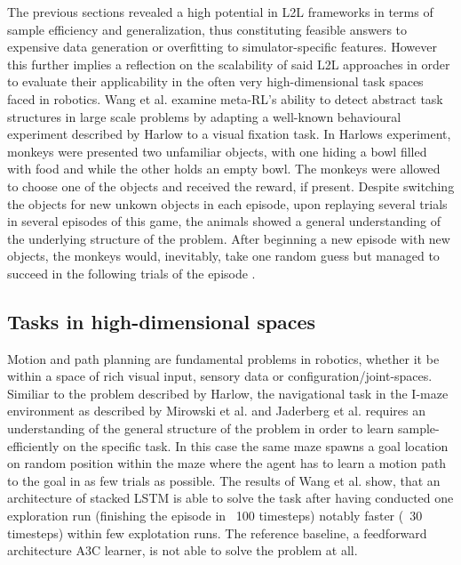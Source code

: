 \documentclass[letterpaper, 10 pt, conference]{ieeeconf}  %
\begin{document}
The previous sections revealed a high potential in L2L frameworks in terms of sample efficiency and generalization, thus constituting 
feasible answers to expensive data generation or overfitting to simulator-specific features. However this further implies a 
reflection on the scalability of said L2L approaches in order to evaluate their applicability in the often very
high-dimensional task spaces faced in robotics. \newline
Wang et al.\cite{wangLearningReinforcementLearn2016} examine meta-RL's ability to detect abstract task 
structures in large scale problems by adapting a well-known behavioural experiment 
described by Harlow \cite{harlowFormationLearningSets1949} to a visual fixation task. In Harlows experiment, 
monkeys were presented two unfamiliar objects, with one 
hiding a bowl filled with food and while the other holds an empty bowl. The monkeys were allowed to choose one
 of the objects and received the reward, if present. 
Despite switching the objects for new unkown objects in each episode, upon replaying several trials in 
several episodes of this game, the animals showed
a general understanding of the underlying structure of the problem. After beginning a new episode with new objects, 
the monkeys would, inevitably, take 
one random guess but managed to succeed in the following trials of the episode \cite{botvinickReinforcementLearningFast2019}. \newline

\subsection{Tasks in high-dimensional spaces}

Motion and path planning are fundamental problems in robotics, whether it be within a space of rich visual input, sensory data or
configuration/joint-spaces. Similiar to the problem described by Harlow, the navigational task in the I-maze environment as described by 
Mirowski et al.\cite{mirowskiLearningNavigateComplex2016} and Jaderberg et al.\cite{jaderbergReinforcementLearningUnsupervised2016} 
requires an understanding of the general structure of the problem in order to learn sample-efficiently 
on the specific task. In this case the same maze spawns a goal location on random position within the maze where the agent has to learn
a motion path to the goal in as few trials as possible. The results of Wang et al.\cite{wangLearningReinforcementLearn2016}
 show, that an architecture of stacked LSTM is able to 
solve the task after having conducted one exploration run (finishing the episode in ~100 timesteps) notably faster (~30 timesteps) within few
explotation runs. The reference baseline, a feedforward architecture A3C learner, is not able to solve the problem at all. 
 
\end{document}
